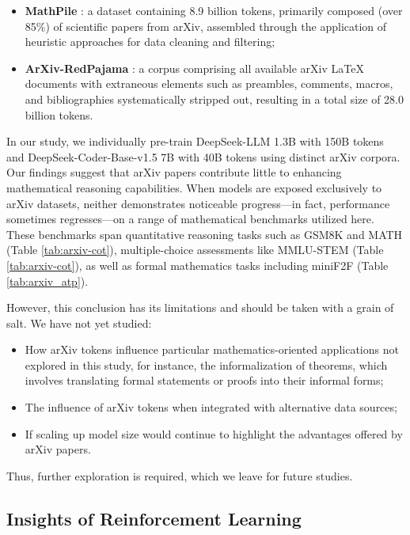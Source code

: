 \begin{itemize}[topsep=0pt]
\begin{itemize}[topsep=0pt]
\begin{itemize}[topsep=0pt]
    \item \textbf{MathPile} \citep{mathpile}: a dataset containing 8.9 billion tokens, primarily composed (over 85\%) of scientific papers from arXiv, assembled through the application of heuristic approaches for data cleaning and filtering;
    \item \textbf{ArXiv-RedPajama} \citep{redpajama}: a corpus comprising all available arXiv LaTeX documents with extraneous elements such as preambles, comments, macros, and bibliographies systematically stripped out, resulting in a total size of 28.0 billion tokens.
\end{itemize}

In our study, we individually pre-train DeepSeek-LLM 1.3B with 150B tokens and DeepSeek-Coder-Base-v1.5 7B with 40B tokens using distinct arXiv corpora. Our findings suggest that arXiv papers contribute little to enhancing mathematical reasoning capabilities. When models are exposed exclusively to arXiv datasets, neither demonstrates noticeable progress—in fact, performance sometimes regresses—on a range of mathematical benchmarks utilized here. These benchmarks span quantitative reasoning tasks such as GSM8K and MATH (Table \ref{tab:arxiv-cot}), multiple-choice assessments like MMLU-STEM (Table \ref{tab:arxiv-cot}), as well as formal mathematics tasks including miniF2F (Table \ref{tab:arxiv_atp}).

However, this conclusion has its limitations and should be taken with a grain of salt. We have not yet studied:

\begin{itemize}[topsep=0pt]
    \item How arXiv tokens influence particular mathematics-oriented applications not explored in this study, for instance, the informalization of theorems, which involves translating formal statements or proofs into their informal forms;
    \item The influence of arXiv tokens when integrated with alternative data sources;
    \item If scaling up model size would continue to highlight the advantages offered by arXiv papers.
\end{itemize}

Thus, further exploration is required, which we leave for future studies.

\subsection{Insights of Reinforcement Learning}

\end{itemize}
\end{itemize}
